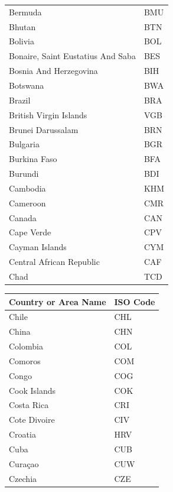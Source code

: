 \documentclass{report}
\begin{document}
\begin{center}
\begin{minipage}{0.46\textwidth}
\begin{tabular}{|p{10.5em}|p{6em}|}
            Bermuda & BMU\\
            Bhutan & BTN\\
            Bolivia & BOL\\
            Bonaire, Saint Eustatius And Saba & BES\\
            Bosnia And Herzegovina & BIH\\
            Botswana & BWA\\
            Brazil & BRA\\
            British Virgin Islands & VGB\\
            Brunei Darussalam & BRN\\
            Bulgaria & BGR\\
            Burkina Faso & BFA\\
            Burundi & BDI\\
            Cambodia & KHM\\
            Cameroon & CMR\\
            Canada & CAN\\
            Cape Verde & CPV\\
            Cayman Islands & CYM\\
            Central African Republic & CAF\\
            Chad & TCD\\
            \hline
        \end{tabular}
    \end{minipage}
    \hfill
    \begin{minipage}{0.46\textwidth}
        \begin{tabular}{|p{10.5em}|p{6em}|}
            \hline
            Country or Area Name & ISO Code\\
            \hline
            Chile & CHL\\
            China & CHN\\
            Colombia & COL\\
            Comoros & COM\\
            Congo & COG\\
            Cook Islands & COK\\
            Costa Rica & CRI\\
            Cote Divoire & CIV\\
            Croatia & HRV\\
            Cuba & CUB\\
            Curaçao & CUW\\
            Czechia & CZE\\

\end{tabular}
\end{minipage}
\end{center}
\end{document}
